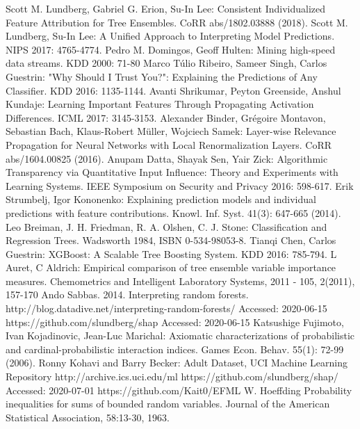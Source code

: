 \documentclass[conference]{IEEEtran}
\begin{document}
\begin{thebibliography}{00}
 Scott M. Lundberg, Gabriel G. Erion, Su-In Lee:
Consistent Individualized Feature Attribution for Tree Ensembles. CoRR abs/1802.03888 (2018).
 Scott M. Lundberg, Su-In Lee: A Unified Approach to Interpreting Model Predictions. NIPS 2017: 4765-4774.
 Pedro M. Domingos, Geoff Hulten: Mining high-speed data streams. KDD 2000: 71-80
 Marco Túlio Ribeiro, Sameer Singh, Carlos Guestrin: "Why Should I Trust You?": Explaining the Predictions of Any Classifier. KDD 2016: 1135-1144.
 Avanti Shrikumar, Peyton Greenside, Anshul Kundaje: Learning Important Features Through Propagating Activation Differences. ICML 2017: 3145-3153.
 Alexander Binder, Grégoire Montavon, Sebastian Bach, Klaus-Robert Müller, Wojciech Samek: Layer-wise Relevance Propagation for Neural Networks with Local Renormalization Layers. CoRR abs/1604.00825 (2016).
Anupam Datta, Shayak Sen, Yair Zick: Algorithmic Transparency via Quantitative Input Influence: Theory and Experiments with Learning Systems. IEEE Symposium on Security and Privacy 2016: 598-617.
Erik Strumbelj, Igor Kononenko: Explaining prediction models and individual predictions with feature contributions. Knowl. Inf. Syst. 41(3): 647-665 (2014).
 Leo Breiman, J. H. Friedman, R. A. Olshen, C. J. Stone: Classification and Regression Trees. Wadsworth 1984, ISBN 0-534-98053-8.
Tianqi Chen, Carlos Guestrin: XGBoost: A Scalable Tree Boosting System. KDD 2016: 785-794.
L Auret, C Aldrich: Empirical comparison of tree ensemble variable importance measures. Chemometrics and Intelligent Laboratory Systems, 2011 - 105, 2(2011), 157-170
Ando Sabbas. 2014. Interpreting random forests. http://blog.datadive.net/interpreting-random-forests/ Accessed: 2020-06-15
https://github.com/slundberg/shap Accessed: 2020-06-15
Katsushige Fujimoto, Ivan Kojadinovic, Jean-Luc Marichal: Axiomatic characterizations of probabilistic and cardinal-probabilistic interaction indices. Games Econ. Behav. 55(1): 72-99 (2006).
Ronny Kohavi and Barry Becker: Adult Dataset, UCI Machine Learning Repository http://archive.ics.uci.edu/ml
 https://github.com/slundberg/shap/ Accessed: 2020-07-01
 https://github.com/Kait0/EFML
 W. Hoeffding Probability inequalities for sums of bounded random variables. Journal of the American Statistical Association, 58:13-30, 1963.


\end{thebibliography}
\end{document}
